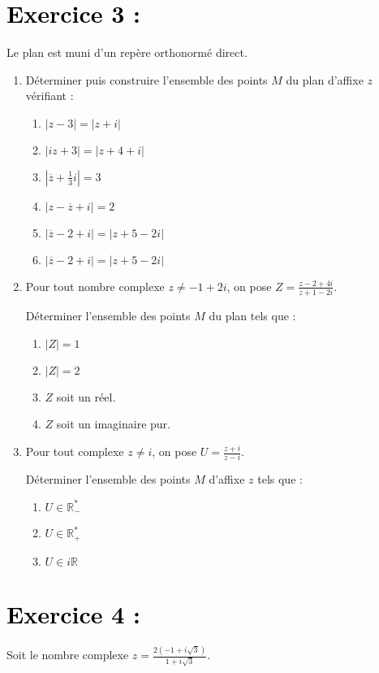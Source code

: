\documentclass[12pt]{article}
\begin{document}
\section*{\textcolor{black}{Exercice 3 :}}
Le plan est muni d'un rep\`ere orthonorm\'e direct.
\begin{enumerate}
    \item D\'eterminer puis construire l'ensemble des points $M$ du plan d'affixe $z$ v\'erifiant :
    \begin{enumerate}
        \item $|z - 3| = |z + i|$
        \item $|iz + 3| = |z + 4 + i|$
        \item $|\overline{z} + \frac{1}{3}i| = 3$
        \item $|z - \overline{z} + i| = 2$
        \item $|\overline{z} - 2 + i| = |z + 5 - 2i|$
        \item $|\overline{z} - 2 + i| = |z + 5 - 2i|$
    \end{enumerate}
    \item Pour tout nombre complexe $z \neq -1 + 2i$, on pose $Z = \frac{z - 2 + 4i}{z + 1 - 2i}$.

    Déterminer l'ensemble des points $M$ du plan tels que :

\begin{enumerate}
        \item $|Z| = 1$
        \item $|Z| = 2$
        \item $Z$ soit un réel.
        \item $Z$ soit un imaginaire pur.
\end{enumerate}
    \item Pour tout complexe $z \neq i$, on pose
    \(
    U = \frac{z + i}{z - i}.
    \)
    
    Déterminer l’ensemble des points $M$ d’affixe $z$ tels que :
    \begin{enumerate}
        \item $U \in \mathbb{R}^*_{-}$
        \item $U \in \mathbb{R}^*_{+}$
        \item $U \in i\mathbb{R}$
    \end{enumerate}
\end{enumerate}

\section*{\textcolor{black}{Exercice 4 :}}
Soit le nombre complexe 
\(
z = \frac{2(-1 + i\sqrt{3})}{1 + i\sqrt{3}}.
\)
\end{document}
